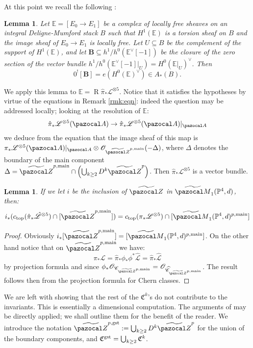\documentclass[11pt]{amsart}
\newcommand{\PP}{\mathbb P}
\newcommand{\OO}{\mathcal O}
\renewcommand{\to}{\rightarrow}
\newcommand{\A}{\pazocal A}
\newcommand{\cC}{\mathcal C}
\newcommand{\hC}{\widehat{\mathcal C}}
\newcommand{\tZ}{\widetilde{\pazocal Z}}
\newcommand{\tZp}{\widetilde{\pazocal Z}^p}
\newcommand{\tM}{\widetilde{\pazocal M}}
\newcommand{\R}{\operatorname{R}}
\theoremstyle{plain}
\newtheorem{lem}[thm]{Lemma}
\theoremstyle{definition}
\begin{document}
At this point we recall the following \cite[Lemma 5.3]{CLpfields}:
\begin{lem}
Let $\mathbb E=[E_0\to E_1]$ be a complex of locally free sheaves on an integral Deligne-Mumford stack $B$ such that
$H^1(\mathbb E)$ is a torsion sheaf on $B$ and the image sheaf of $E_0\to E_1$ is locally free.
Let $U\subseteq B$ be the complement of the support of $H^1(\mathbb E)$, and let $\mathbf{B}\subseteq h^1/h^0(\mathbb E^\vee[-1])$
be the closure of the zero section  of the vector bundle $h^1/h^0(\mathbb E^\vee[-1]|_U)= H^0(\mathbb E|_U)^\vee$. Then
$$0^![\mathbf{B}]=e(H^0(\mathbb E)^\vee)\in A_*(B).
$$
\end{lem}

We apply this lemma to $\mathbb E=\R\hat{\pi}_*\mathcal L^{\otimes 5}$. Notice that it satisfies the hypotheses by virtue of the equations in Remark \ref{rmk:eqn}: indeed the question may be addressed locally; looking at the resolution of $\mathbb E$:
\[
 \hat\pi_*\mathcal L^{\otimes 5}(\A)\to \hat\pi_*\mathcal L^{\otimes 5}(\A)\rvert_{\A}
\]
we deduce from the equation that the image sheaf of this map is $\pi_*\mathcal L^{\otimes 5}(\A)\rvert_{\A}\otimes\OO_{\tZ^{p,\rm{main}}}(-\Delta)$, where $\Delta$ denotes the boundary of the main component $\Delta=\tZ^{p,\rm{main}}\cap\left(\bigcup_{k\geq 2}D^k\tZp\right)$. Then $\hat\pi_*\mathcal L^{\otimes 5}$ is a vector bundle.

\begin{lem}
 If we let $i$ be the inclusion of $\tZ$ in $\tM_1(\PP^4,d)$, then:
 \[
  i_*(c_{\rm{top}}(\hat{\pi}_*\hat{\mathcal L}^{\otimes 5})\cap[\tZ^{p,\rm{main}}])=c_{\rm{top}}({\pi}_*\mathcal L^{\otimes 5})\cap[\tM_1(\PP^4,d)^{p,\rm{main}}]
 \]
\end{lem}
\begin{proof}
 Obviously $i_*[\tZ^{p,\rm{main}}]=[\tM_1(\PP^4,d)^{p,\rm{main}}]$. On the other hand notice that on $\tZ^{p,\rm{main}}$ we have:
 \[
  \pi_*\mathcal L=\hat{\pi}_*\phi_*\phi^*\hat{\mathcal L}=\hat{\pi}_*\hat{\mathcal L}
 \]
by projection formula and since $\phi_*\OO_{\cC_{\tZ^{p,\rm{main}}}}=\OO_{\hC_{\tZ^{p,\rm{main}}}}$. The result follows then from the projection formula for Chern classes.
\end{proof}

We are left with showing that the rest of the $\mathfrak C^k$'s do not contribute to the invariants. This is essentially a dimensional computation. The arguments of \cite[-8]{CLpfields} may be directly applied; we shall outline them for the benefit of the reader. We introduce the notation $\tZ^{p,\rm{gst}}:=\bigcup_{k\geq 2} D^k\tZp$ for the union of the boundary components, and $\mathfrak C^{\rm{gst}}=\bigcup_{k\geq 2}\mathfrak C^k$.
\end{document}
